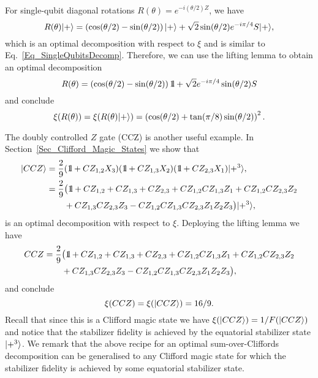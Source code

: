 For single-qubit diagonal rotations $R(\theta)=e^{-i(\theta/2) Z}$,  we have
\begin{equation}
	R(\theta) \vert+\rangle =  \left(\cos(\theta/2)-\sin(\theta/2)\right) \vert+\rangle +  \sqrt{2} \sin(\theta/2) e^{- i \pi / 4} S \vert+\rangle,
\end{equation}	
which is an optimal decomposition with respect to $\xi$ and is similar to Eq.~\eqref{Eq_SingleQubitsDecomp}.  Therefore, we can use the lifting lemma to obtain an optimal decomposition
\begin{equation}
	R(\theta)  =  \left(\cos(\theta/2)-\sin(\theta/2)\right) \id +  \sqrt{2} e^{-  i \pi / 4} \sin(\theta/2) S \label{eqn:Rtheta}
\end{equation}
and conclude 
\begin{equation}
	\xi( R(\theta)  ) = \xi( R(\theta) \vert+\rangle   )  = \left(\cos(\theta/2)+\tan(\pi/8)\sin(\theta /2)\right)^2.
\end{equation}

The doubly controlled $Z$ gate (CCZ) is another useful example.  In Section~\ref{Sec_Clifford_Magic_States} we show that
\begin{align}
 \ket{CCZ}   =   \frac{2}{9} &( \id+ CZ_{1,2}X_3 )(\id + CZ_{1,3} X_2)(\id + CZ_{2,3}X_1)\ket{+^3}, \\ \nonumber
=	    \frac{2}{9} & \big(  \id + CZ_{1,2} + CZ_{1,3} + CZ_{2,3} + CZ_{1,2}CZ_{1,3}Z_1 + CZ_{1,2} CZ_{2,3} Z_2   \\ \nonumber 
	&  + CZ_{1,3} CZ_{2,3} Z_3  - CZ_{1,2}CZ_{1,3}CZ_{2,3} Z_1 Z_2 Z_3 \big)  \ket{+^3} ,
\end{align}	
is an optimal decomposition with respect to $\xi$.  Deploying the lifting lemma we have
\begin{align}
	CCZ   = \frac{2}{9} & \big(  \id + CZ_{1,2} + CZ_{1,3} + CZ_{2,3} + CZ_{1,2}CZ_{1,3}Z_1 + CZ_{1,2} CZ_{2,3} Z_2  \label{eqn:CCZ_decomposition}   \\ \nonumber 
	& + CZ_{1,3} CZ_{2,3} Z_3  - CZ_{1,2}CZ_{1,3}CZ_{2,3} Z_1 Z_2 Z_3 \big) ,
\end{align}	
and conclude
\begin{equation}
	\xi( CCZ  ) = \xi( \vert CCZ\rangle   )  = 16/9 .
\end{equation}
Recall that since this is a Clifford magic state we have  $ \xi( \vert CCZ\rangle   ) = 1 / F( \vert CCZ\rangle)$ and notice that the stabilizer fidelity is achieved by the equatorial stabilizer state $\vert+^3\rangle$.  We remark that the above recipe for an optimal sum-over-Cliffords decomposition can be generalised to any Clifford magic state for which the stabilizer fidelity is achieved by some equatorial stabilizer state.


